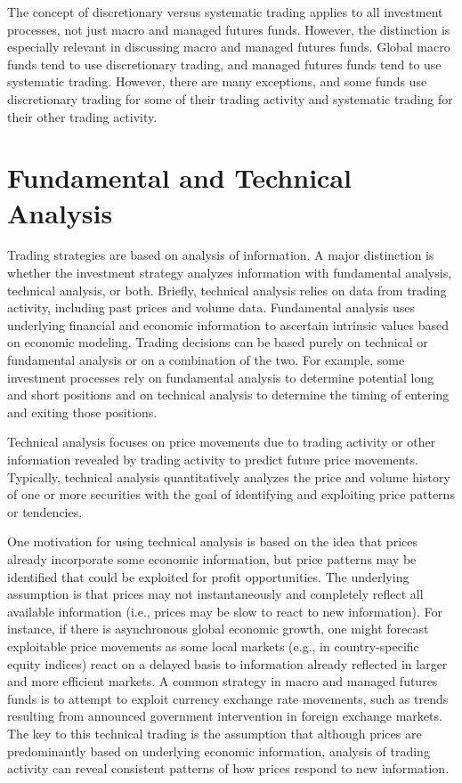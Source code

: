 \documentclass[11pt]{article}
\begin{document}
The concept of discretionary versus systematic trading applies to all investment processes, not just macro and managed futures funds. However, the distinction is especially relevant in discussing macro and managed futures funds. Global macro funds tend to use discretionary trading, and managed futures funds tend to use systematic trading. However, there are many exceptions, and some funds use discretionary trading for some of their trading activity and systematic trading for their other trading activity.

\section*{Fundamental and Technical Analysis}
Trading strategies are based on analysis of information. A major distinction is whether the investment strategy analyzes information with fundamental analysis, technical analysis, or both. Briefly, technical analysis relies on data from trading activity, including past prices and volume data. Fundamental analysis uses underlying financial and economic information to ascertain intrinsic values based on economic modeling. Trading decisions can be based purely on technical or fundamental analysis or on a combination of the two. For example, some investment processes rely on fundamental analysis to determine potential long and short positions and on technical analysis to determine the timing of entering and exiting those positions.

Technical analysis focuses on price movements due to trading activity or other information revealed by trading activity to predict future price movements. Typically, technical analysis quantitatively analyzes the price and volume history of one or more securities with the goal of identifying and exploiting price patterns or tendencies.

One motivation for using technical analysis is based on the idea that prices already incorporate some economic information, but price patterns may be identified that could be exploited for profit opportunities. The underlying assumption is that prices may not instantaneously and completely reflect all available information (i.e., prices may be slow to react to new information). For instance, if there is asynchronous global economic growth, one might forecast exploitable price movements as some local markets (e.g., in country-specific equity indices) react on a delayed basis to information already reflected in larger and more efficient markets. A common strategy in macro and managed futures funds is to attempt to exploit currency exchange rate movements, such as trends resulting from announced government intervention in foreign exchange markets. The key to this technical trading is the assumption that although prices are predominantly based on underlying economic information, analysis of trading activity can reveal consistent patterns of how prices respond to new information.
\end{document}
